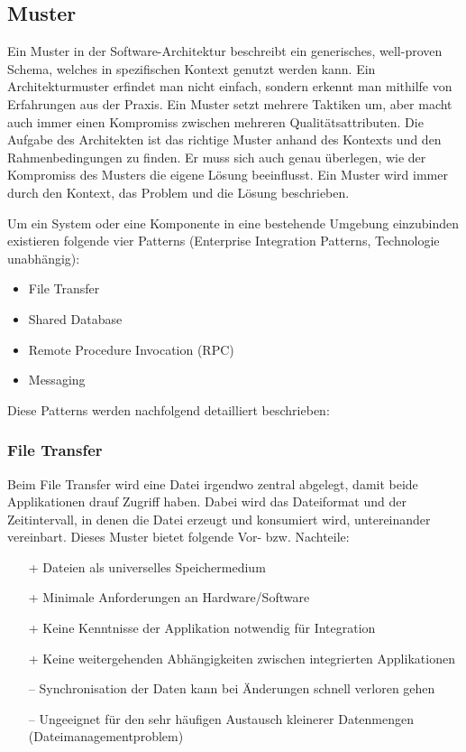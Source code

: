 \subsection{Muster}

Ein Muster in der Software-Architektur beschreibt ein generisches, well-proven Schema, welches in spezifischen Kontext genutzt werden kann. Ein Architekturmuster erfindet man nicht einfach, sondern erkennt man mithilfe von Erfahrungen aus der Praxis. Ein Muster setzt mehrere Taktiken um, aber macht auch immer einen Kompromiss zwischen mehreren Qualitätsattributen. Die Aufgabe des Architekten ist das richtige Muster anhand des Kontexts und den Rahmenbedingungen zu finden. Er muss sich auch genau überlegen, wie der Kompromiss des Musters die eigene Lösung beeinflusst. Ein Muster wird immer durch den Kontext, das Problem und die Lösung beschrieben.

Um ein System oder eine Komponente in eine bestehende Umgebung einzubinden existieren folgende vier Patterns (Enterprise Integration Patterns, Technologie unabhängig):
\begin{itemize}
	\item File Transfer
	\item Shared Database
	\item Remote Procedure Invocation (RPC)
	\item Messaging
\end{itemize}
Diese Patterns werden nachfolgend detailliert beschrieben:

\subsubsection{File Transfer}

Beim File Transfer wird eine Datei irgendwo zentral abgelegt, damit beide Applikationen drauf Zugriff haben. Dabei wird das Dateiformat und der Zeitintervall, in denen die Datei erzeugt und konsumiert wird, untereinander vereinbart. Dieses Muster bietet folgende Vor- bzw. Nachteile:
\begin{itemize}
	\item[+] Dateien als universelles Speichermedium
	\item[+] Minimale Anforderungen an Hardware/Software
	\item[+] Keine Kenntnisse der Applikation notwendig für Integration
	\item[+] Keine weitergehenden Abhängigkeiten zwischen integrierten Applikationen	
	\item[--] Synchronisation der Daten kann bei Änderungen schnell verloren gehen	
	\item[--] Ungeeignet für den sehr häufigen Austausch kleinerer Datenmengen (Dateimanagementproblem)
\end{itemize}

